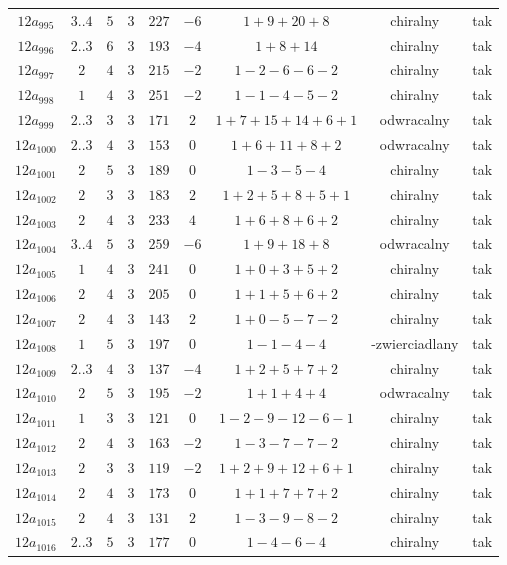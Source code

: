 \begin{longtable}{ccccccccc}
$12a_{995}$ & $3..4$ & $5$ & $3$ & $227$ & $-6$ & $1+9+20+8$ & chiralny & tak \\
$12a_{996}$ & $2..3$ & $6$ & $3$ & $193$ & $-4$ & $1+8+14$ & chiralny & tak \\
$12a_{997}$ & $2$ & $4$ & $3$ & $215$ & $-2$ & $1-2-6-6-2$ & chiralny & tak \\
$12a_{998}$ & $1$ & $4$ & $3$ & $251$ & $-2$ & $1-1-4-5-2$ & chiralny & tak \\
$12a_{999}$ & $2..3$ & $3$ & $3$ & $171$ & $2$ & $1+7+15+14+6+1$ & odwracalny & tak \\
$12a_{1000}$ & $2..3$ & $4$ & $3$ & $153$ & $0$ & $1+6+11+8+2$ & odwracalny & tak \\
$12a_{1001}$ & $2$ & $5$ & $3$ & $189$ & $0$ & $1-3-5-4$ & chiralny & tak \\
$12a_{1002}$ & $2$ & $3$ & $3$ & $183$ & $2$ & $1+2+5+8+5+1$ & chiralny & tak \\
$12a_{1003}$ & $2$ & $4$ & $3$ & $233$ & $4$ & $1+6+8+6+2$ & chiralny & tak \\
$12a_{1004}$ & $3..4$ & $5$ & $3$ & $259$ & $-6$ & $1+9+18+8$ & odwracalny & tak \\
$12a_{1005}$ & $1$ & $4$ & $3$ & $241$ & $0$ & $1+0+3+5+2$ & chiralny & tak \\
$12a_{1006}$ & $2$ & $4$ & $3$ & $205$ & $0$ & $1+1+5+6+2$ & chiralny & tak \\
$12a_{1007}$ & $2$ & $4$ & $3$ & $143$ & $2$ & $1+0-5-7-2$ & chiralny & tak \\
$12a_{1008}$ & $1$ & $5$ & $3$ & $197$ & $0$ & $1-1-4-4$ & -zwierciadlany & tak \\
$12a_{1009}$ & $2..3$ & $4$ & $3$ & $137$ & $-4$ & $1+2+5+7+2$ & chiralny & tak \\
$12a_{1010}$ & $2$ & $5$ & $3$ & $195$ & $-2$ & $1+1+4+4$ & odwracalny & tak \\
$12a_{1011}$ & $1$ & $3$ & $3$ & $121$ & $0$ & $1-2-9-12-6-1$ & chiralny & tak \\
$12a_{1012}$ & $2$ & $4$ & $3$ & $163$ & $-2$ & $1-3-7-7-2$ & chiralny & tak \\
$12a_{1013}$ & $2$ & $3$ & $3$ & $119$ & $-2$ & $1+2+9+12+6+1$ & chiralny & tak \\
$12a_{1014}$ & $2$ & $4$ & $3$ & $173$ & $0$ & $1+1+7+7+2$ & chiralny & tak \\
$12a_{1015}$ & $2$ & $4$ & $3$ & $131$ & $2$ & $1-3-9-8-2$ & chiralny & tak \\
$12a_{1016}$ & $2..3$ & $5$ & $3$ & $177$ & $0$ & $1-4-6-4$ & chiralny & tak \\

\end{longtable}
